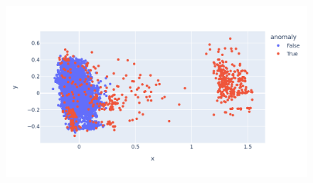 \begin{figure}[t]
\includegraphics[width=14cm, scale=1]{images/mvm_result}
\centering
\end{figure}

